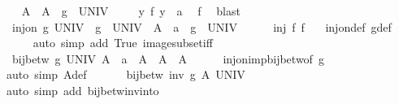 \begin{isabellebody}
\ \ \isamarkupfalse%
\ A{\isacharprime}{\kern0pt}\ \ {\isachardoublequoteopen}A{\isacharprime}{\kern0pt}\ {\isacharequal}{\kern0pt}\ g\ {\isacharbackquote}{\kern0pt}\ UNIV{\isachardoublequoteclose}\isanewline
\ \ \isamarkupfalse%
\ {\isacharasterisk}{\kern0pt}{\isacharcolon}{\kern0pt}\ {\isachardoublequoteopen}{\isasymforall}y{\isachardot}{\kern0pt}\ f\ y\ {\isasymnoteq}\ a{\isachardoublequoteclose}\ \isamarkupfalse%
\ f\ \isamarkupfalse%
\ blast\isanewline
\ \ \isamarkupfalse%
\ {}{\isacharcolon}{\kern0pt}\ {\isachardoublequoteopen}inj{\isacharunderscore}{\kern0pt}on\ g\ UNIV\ {\isasymand}\ g\ {\isacharbackquote}{\kern0pt}\ UNIV\ {\isasymsubseteq}\ A\ {\isasymand}\ a\ {\isasymin}\ g\ {\isacharbackquote}{\kern0pt}\ UNIV{\isachardoublequoteclose}\isanewline
\ \ \ \ \isamarkupfalse%
\ {\isacartoucheopen}inj\ f{\isacartoucheclose}\ f\ {\isacharasterisk}{\kern0pt}\ \isamarkupfalse%
\ inj{\isacharunderscore}{\kern0pt}on{\isacharunderscore}{\kern0pt}def\ g{\isacharunderscore}{\kern0pt}def\isanewline
\ \ \ \ \isamarkupfalse%
\ {\isacharparenleft}{\kern0pt}auto\ simp\ add{\isacharcolon}{\kern0pt}\ True\ image{\isacharunderscore}{\kern0pt}subset{\isacharunderscore}{\kern0pt}iff{\isacharparenright}{\kern0pt}\isanewline
\ \ \isamarkupfalse%
\ \isamarkupfalse%
\ {}{\isacharcolon}{\kern0pt}\ {\isachardoublequoteopen}bij{\isacharunderscore}{\kern0pt}betw\ g\ UNIV\ A{\isacharprime}{\kern0pt}\ {\isasymand}\ a\ {\isasymin}\ A{\isacharprime}{\kern0pt}\ {\isasymand}\ A{\isacharprime}{\kern0pt}\ {\isasymsubseteq}\ A{\isachardoublequoteclose}\isanewline
\ \ \ \ \isamarkupfalse%
\ inj{\isacharunderscore}{\kern0pt}on{\isacharunderscore}{\kern0pt}imp{\isacharunderscore}{\kern0pt}bij{\isacharunderscore}{\kern0pt}betw{\isacharbrackleft}{\kern0pt}of\ g{\isacharbrackright}{\kern0pt}\ \isamarkupfalse%
\ {\isacharparenleft}{\kern0pt}auto\ simp{\isacharcolon}{\kern0pt}\ A{\isacharprime}{\kern0pt}{\isacharunderscore}{\kern0pt}def{\isacharparenright}{\kern0pt}\isanewline
\ \ \isamarkupfalse%
\ \isamarkupfalse%
\ {}{\isacharcolon}{\kern0pt}\ {\isachardoublequoteopen}bij{\isacharunderscore}{\kern0pt}betw\ {\isacharparenleft}{\kern0pt}inv\ g{\isacharparenright}{\kern0pt}\ A{\isacharprime}{\kern0pt}\ UNIV{\isachardoublequoteclose}\isanewline
\ \ \ \ \isamarkupfalse%
\ {\isacharparenleft}{\kern0pt}auto\ simp\ add{\isacharcolon}{\kern0pt}\ bij{\isacharunderscore}{\kern0pt}betw{\isacharunderscore}{\kern0pt}inv{\isacharunderscore}{\kern0pt}into{\isacharparenright}{\kern0pt}\isanewline

\end{isabellebody}
